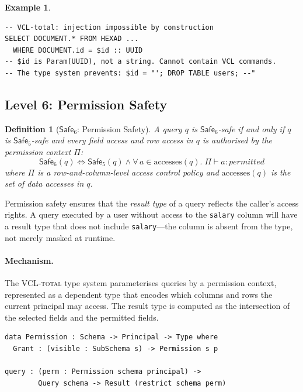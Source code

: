 \documentclass[11pt,a4paper]{article}
\newtheorem{definition}[theorem]{Definition}
\newtheorem{example}[theorem]{Example}
\newcommand{\VCL}{\textsc{VCL-total}}
\newcommand{\Safe}[1]{\ensuremath{\mathsf{Safe}_{#1}}}
\begin{document}
\begin{example}
\begin{lstlisting}[language=VCL]
-- VCL-total: injection impossible by construction
SELECT DOCUMENT.* FROM HEXAD ...
  WHERE DOCUMENT.id = $id :: UUID
-- $id is Param(UUID), not a string. Cannot contain VCL commands.
-- The type system prevents: $id = "'; DROP TABLE users; --"
\end{lstlisting}
\end{example}

\subsection{Level 6: Permission Safety}\label{sec:L6}

\begin{definition}[\Safe{6}: Permission Safety]
A query $q$ is \Safe{6}-safe if and only if $q$ is \Safe{5}-safe and
every field access and row access in $q$ is authorised by the
permission context $\Pi$:
\[
  \Safe{6}(q) \iff \Safe{5}(q) \land
  \forall\, a \in \mathrm{accesses}(q).\;
  \Pi \vdash a : \mathit{permitted}
\]
where $\Pi$ is a row-and-column-level access control policy and
$\mathrm{accesses}(q)$ is the set of data accesses in $q$.
\end{definition}

Permission safety ensures that the \emph{result type} of a query
reflects the caller's access rights.  A query executed by a user
without access to the \texttt{salary} column will have a result type
that does not include \texttt{salary}---the column is absent from the
type, not merely masked at runtime.

\paragraph{Mechanism.}
The \VCL{} type system parameterises queries by a permission context,
represented as a dependent type that encodes which columns and rows the
current principal may access.  The result type is computed as the
intersection of the selected fields and the permitted fields.

\begin{lstlisting}[language=Idris2]
data Permission : Schema -> Principal -> Type where
  Grant : (visible : SubSchema s) -> Permission s p

query : (perm : Permission schema principal) ->
        Query schema -> Result (restrict schema perm)
\end{lstlisting}
\end{document}
